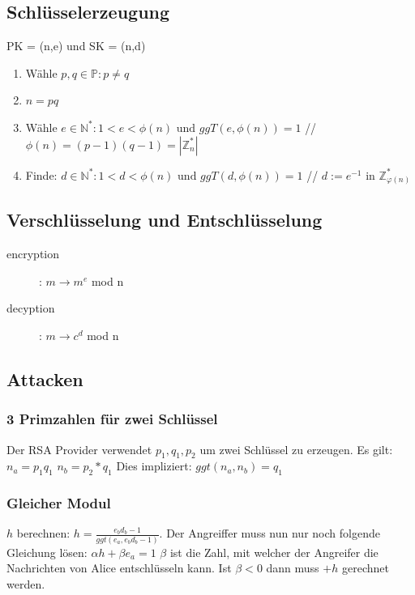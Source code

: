 \documentclass[10pt]{article}
\newcommand{\NN}{\mathbb{N}} %
\newcommand{\ZN}{\mathbb{Z}} %
\newcommand{\PN}{\mathbb{P}} %
\newcommand{\T}[1]{\text{#1}} %
\begin{document}
\subsection{Schlüsselerzeugung}
PK = (n,e) und SK = (n,d) 
\begin{enumerate}
	\item Wähle $p,q \in \PN :p \neq q$
	\item $n=pq$
	\item Wähle $e \in \NN^* : 1<e<\phi(n)\T{ und }ggT(e,\phi(n))=1$ {\color{gray}// $\phi(n)=(p-1)(q-1) = |\ZN^*_n|$ }
	\item Finde: $d \in \NN^* :1<d<\phi(n)\T{ und }ggT(d,\phi(n))=1$ {\color{gray}// $d:=e^{-1}$ in $\ZN^*_{\varphi(n)}$} 
\end{enumerate}
\subsection{Verschlüsselung und Entschlüsselung}
\begin{description}
	\item[encryption] : $m \longrightarrow m^e$ mod n
	\item[decyption] : $m \longrightarrow c^d$ mod n
\end{description} 
\subsection{Attacken}
\subsubsection{3 Primzahlen für zwei Schlüssel}
Der RSA Provider verwendet $p_1, q_1, p_2$ um zwei Schlüssel zu erzeugen. Es gilt: $n_a = p_1 q_1$ $n_b = p_2*q_1$ Dies impliziert: $ggt(n_a, n_b) = q_1$
\subsubsection{Gleicher Modul}
$h$ berechnen: $ h = \frac{e_b d_b - 1}{ggt(e_a, e_b d_b -1)}$. Der
Angreiffer muss nun nur noch folgende Gleichung lösen: $\alpha h + \beta e_a = 1$ $\beta$ ist die Zahl, mit welcher der Angreifer die Nachrichten von Alice entschlüsseln kann. Ist $\beta < 0$ dann muss $+h$ gerechnet werden.
\end{document}
